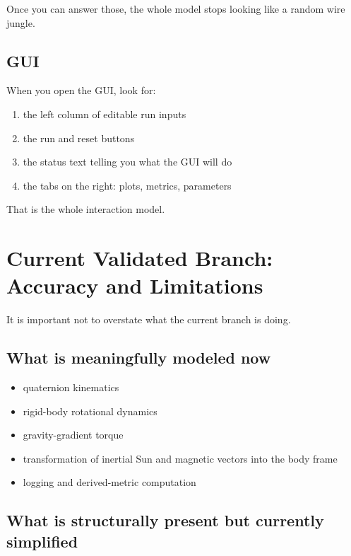 \documentclass[11pt]{article}
\begin{document}
Once you can answer those, the whole model stops looking like a random wire jungle.

\subsection{GUI}

When you open the GUI, look for:

\begin{enumerate}
\item the left column of editable run inputs
\item the run and reset buttons
\item the status text telling you what the GUI will do
\item the tabs on the right: plots, metrics, parameters
\end{enumerate}

That is the whole interaction model.

\section{Current Validated Branch: Accuracy and Limitations}

It is important not to overstate what the current branch is doing.

\subsection{What is meaningfully modeled now}

\begin{itemize}
\item quaternion kinematics
\item rigid-body rotational dynamics
\item gravity-gradient torque
\item transformation of inertial Sun and magnetic vectors into the body frame
\item logging and derived-metric computation
\end{itemize}

\subsection{What is structurally present but currently simplified}
\end{document}
